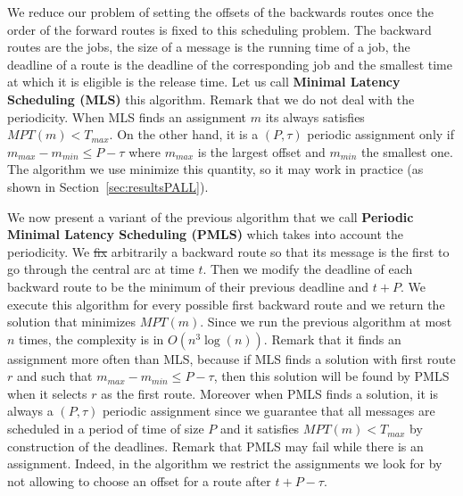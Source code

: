 \documentclass[10pt, conference, letterpaper]{IEEEtran}
\providecommand{\DIFaddtex}[1]{{\protect\color{blue}\uwave{#1}}} %
\providecommand{\DIFdeltex}[1]{{\protect\color{red}\sout{#1}}}                      %
\providecommand{\DIFaddbegin}{} %
\providecommand{\DIFaddend}{} %
\providecommand{\DIFdelbegin}{} %
\providecommand{\DIFdelend}{} %
\providecommand{\DIFadd}[1]{\texorpdfstring{\DIFaddtex{#1}}{#1}} %
\providecommand{\DIFdel}[1]{\texorpdfstring{\DIFdeltex{#1}}{}} %
\newcommand{\DIFscaledelfig}{0.5}
\newlength{\DIFdelgraphicswidth} %
\newlength{\DIFdelgraphicsheight} %
\newcommand{\DIFaddincludegraphics}[2][]{{\color{blue}\fbox{\DIFOincludegraphics[#1]{#2}}}} %
\newcommand{\DIFdelincludegraphics}[2][]{%
\sbox{\DIFdelgraphicsbox}{\DIFOincludegraphics[#1]{#2}}%
\settoboxwidth{\DIFdelgraphicswidth}{\DIFdelgraphicsbox} %
\settoboxtotalheight{\DIFdelgraphicsheight}{\DIFdelgraphicsbox} %
\scalebox{\DIFscaledelfig}{%
\parbox[b]{\DIFdelgraphicswidth}{\usebox{\DIFdelgraphicsbox}\\[-\baselineskip] \rule{\DIFdelgraphicswidth}{0em}}\llap{\resizebox{\DIFdelgraphicswidth}{\DIFdelgraphicsheight}{%
\setlength{\unitlength}{\DIFdelgraphicswidth}%
\begin{picture}(1,1)%
\thicklines\linethickness{2pt} %
{\color[rgb]{1,0,0}\put(0,0){\framebox(1,1){}}}%
{\color[rgb]{1,0,0}\put(0,0){\line( 1,1){1}}}%
{\color[rgb]{1,0,0}\put(0,1){\line(1,-1){1}}}%
\end{picture}%
}\hspace*{3pt}}} %
} %
\DeclareRobustCommand{\DIFaddbegin}{\DIFOaddbegin \let\includegraphics\DIFaddincludegraphics} %
\DeclareRobustCommand{\DIFaddend}{\DIFOaddend \let\includegraphics\DIFOincludegraphics} %
\DeclareRobustCommand{\DIFdelbegin}{\DIFOdelbegin \let\includegraphics\DIFdelincludegraphics} %
\DeclareRobustCommand{\DIFdelend}{\DIFOaddend \let\includegraphics\DIFOincludegraphics} %
\begin{document}
     We reduce our problem of setting the offsets of the backwards routes once the order of the forward routes is fixed to this
     scheduling problem. The backward routes are the jobs, the size of a message is the running time of a job,
     the deadline of a route is the deadline of the corresponding job and the smallest time at which it is eligible is the release time. Let us call {\bf Minimal Latency Scheduling (MLS)} this algorithm.
     Remark that we do not deal with the periodicity. When MLS finds an assignment $m$ its always satisfies $MPT(m) < T_{max}$. On the other hand, it is a $(P,\tau)$ periodic assignment only if $m_{max} - m_{min} \leq P -\tau$ where $m_{max}$ is the largest offset and $m_{min}$ the smallest one. The algorithm we use minimize this quantity, so it may work in practice (as shown in Section~\ref{sec:resultsPALL}).

     We now present a variant of the previous algorithm that we call {\bf Periodic Minimal Latency Scheduling (PMLS)}
     which takes into account the periodicity. We \DIFdelbegin \DIFdel{fix }\DIFdelend \DIFaddbegin \DIFadd{set }\DIFaddend arbitrarily a backward route so that its message is the first to go through the central arc at time $t$. Then we modify the deadline of each backward route to be the minimum of their previous deadline and $t + P$.  We execute this algorithm for every possible first backward route and we return the solution that minimizes $MPT(m)$. Since we run the previous algorithm at most $n$ times, the complexity is in $O(n^3\log(n))$. Remark that it finds an assignment more often than MLS, because if MLS finds a solution with first route $r$ and such that $m_{max} - m_{min} \leq P -\tau$, then this solution will be found by PMLS when it selects $r$ as the first route. Moreover when PMLS finds a solution, it is always a $(P,\tau)$ periodic assignment since we guarantee that all messages are scheduled in a period of time of size $P$ and it satisfies $MPT(m) < T_{max}$ by construction of the deadlines. Remark that PMLS may fail while there is an assignment. Indeed, in the algorithm we restrict the assignments we look for by not allowing to choose an offset for a route after $t+P- \tau$.

%   
%     
% 
%     
% 
% 
\end{document}
